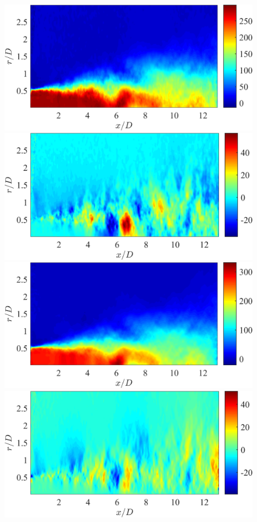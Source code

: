 \begin{figure}
	\centering
		\includegraphics[width=0.45\linewidth]{Figures/ch5_valid_Inst_Uz.png} %
		\includegraphics[width=0.45\linewidth]{Figures/ch5_valid_Inst_Ur.png}\\
		\includegraphics[width=0.45\linewidth]{Figures/ch5_valid_Inst_solUz.png}
		\includegraphics[width=0.45\linewidth]{Figures/ch5_valid_Inst_solUr.png}\\

\end{figure}
